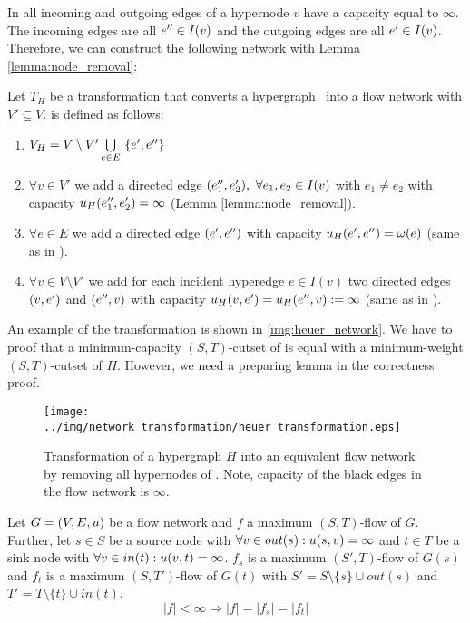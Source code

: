 In  all incoming and outgoing edges of a hypernode $v$ have a
capacity equal to $\infty$. The incoming edges are all $e'' \in I(v)$ and
the outgoing edges are all $e' \in I(v)$. Therefore, we can construct the
following network with Lemma \ref{lemma:node_removal}:

\begin{definition}
Let $T_H$ be a transformation that converts a hypergraph \HypergraphDef~into 
a flow network  with $V' \subseteq V$.  is defined as follows:
\begin{enumerate}
\item $V_H = V\setminus V' \bigcup\limits_{e \in E}\ \{e', e''\}$
\item $\forall v \in V'$ we add a directed edge $(e_1'', e_2'),\ \forall e_1, e_2 \in I(v)$ 
      with $e_1 \neq e_2$ with capacity $u_H(e_1'', e_2') = \infty$ (Lemma \ref{lemma:node_removal}).
\item $\forall e \in E$ we add a directed edge $(e',e'')$
      with capacity $u_H(e',e'') = \omega(e)$ (same as in ).
\item $\forall v \in V\setminus V'$ we add for each incident hyperedge $e \in I(v)$ two directed
      edges $(v,e')$ and $(e'',v)$ with capacity 
      $u_H(v,e') = u_H(e'',v) := \infty$ (same as in ).
\end{enumerate} 
\end{definition}

An example of the transformation is shown in \autoref{img:heuer_network}.
We have to proof that a minimum-capacity $(S,T)$-cutset
of  is equal with a minimum-weight $(S,T)$-cutset of $H$. However,
we need a preparing lemma in the correctness proof.

\begin{figure}
\centering
\texttt{[image: ../img/network\_transformation/heuer\_transformation.eps]}
\caption{Transformation of a hypergraph $H$ into an equivalent flow network  by removing
         all hypernodes of . Note, capacity of the black edges in the flow network is $\infty$.}
\label{img:heuer_network}
\end{figure}

\begin{lemma}
\label{lemma:source_and_sink_removal}
Let $G = (V,E,u)$ be a flow network and $f$ a maximum $(S,T)$-flow of $G$.
Further, let $s \in S$ be a source node with $\forall v \in out(s): u(s,v) = \infty$
and $t \in T$ be a sink node with $\forall v \in in(t): u(v,t) = \infty$.
$f_s$ is a maximum $(S',T)$-flow of $G(s)$ and $f_t$ is a maximum $(S,T')$-flow
of $G(t)$ with $S' = S\setminus \{s\} \cup out(s)$ and $T' = T \setminus \{t\}
\cup in(t)$.
\[|f| < \infty \Rightarrow |f| = |f_s| = |f_t|\]
\end{lemma}

